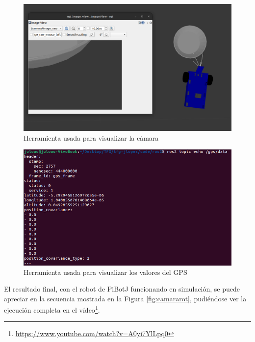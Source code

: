  \begin{figure} [h!]
	\begin{center}
		\includegraphics[width=12cm]{figs/cap6/rqtimage.png}
	\end{center}
	\caption{Herramienta usada para visualizar la cámara}
	\label{fig:rqtimage}
\end{figure}

 \begin{figure} [h!]
	\begin{center}
		\includegraphics[width=12cm]{figs/cap6/echogps.png}
	\end{center}
	\caption{Herramienta usada para visualizar los valores del GPS}
	\label{fig:echogps}
\end{figure}


El resultado final, con el robot de PiBotJ funcionando en simulación, se puede apreciar en la secuencia mostrada en la Figura \ref{fig:camararot}, pudiéndose ver la ejecución completa en el vídeo\footnote{\url{https://www.youtube.com/watch?v=A0yi7YlLpq0}}. 

